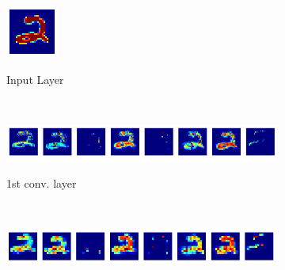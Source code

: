\begin{frame}[plain]
\begin{figure}
\begin{subfigure}{0.1\textwidth}
\includegraphics[width=\textwidth]{cnn_input}
\end{subfigure}
\begin{subfigure}{0.3\textwidth}
\caption*{Input Layer}
\end{subfigure}
\\
\begin{subfigure}{0.6\textwidth}
\includegraphics[width=\textwidth]{cnn_1_conv}
\end{subfigure}
\begin{subfigure}{0.3\textwidth}
\caption*{1st conv. layer}
\end{subfigure}
\\
\begin{subfigure}{0.6\textwidth}
\includegraphics[width=\textwidth]{cnn_1_pool}

\end{subfigure}
\end{figure}
\end{frame}
